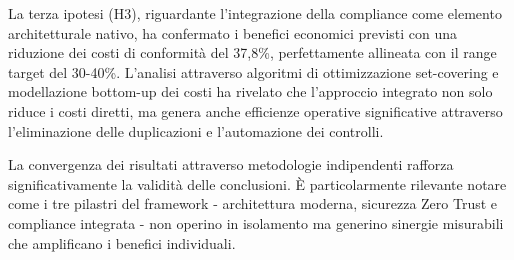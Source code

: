 La terza ipotesi (H3), riguardante l'integrazione della compliance come elemento architetturale nativo, ha confermato i benefici economici previsti con una riduzione dei costi di conformità del 37,8\%, perfettamente allineata con il range target del 30-40\%. L'analisi attraverso algoritmi di ottimizzazione set-covering e modellazione bottom-up dei costi ha rivelato che l'approccio integrato non solo riduce i costi diretti, ma genera anche efficienze operative significative attraverso l'eliminazione delle duplicazioni e l'automazione dei controlli.

La convergenza dei risultati attraverso metodologie indipendenti rafforza significativamente la validità delle conclusioni. È particolarmente rilevante notare come i tre pilastri del framework - architettura moderna, sicurezza Zero Trust e compliance integrata - non operino in isolamento ma generino sinergie misurabili che amplificano i benefici individuali.
